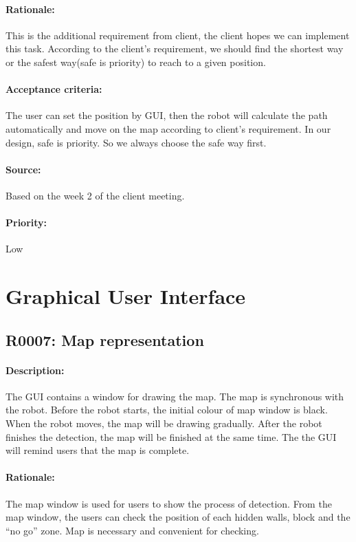 \documentclass[11pt, a4paper]{report}
\begin{document}
\paragraph{Rationale:}
This is the additional requirement from client, the client hopes we can implement this task. According to the client's requirement, we should find the shortest way or the safest way(safe is priority) to reach to a given position. 
\paragraph{Acceptance criteria:}
The user can set the position by GUI, then the robot will calculate the path automatically and move on the map according to client's requirement. In our design, safe is priority. So we always choose the safe way first.     
\paragraph{Source:}
Based on the week 2 of the client meeting.  
\paragraph{Priority:}
Low


\section{Graphical User Interface}
\subsection{R0007: Map representation}
\paragraph{Description:}
The GUI contains a window for drawing the map. The map is synchronous with the robot. Before the  robot starts, the initial colour of map window is black. When the robot moves, the map will be drawing gradually. After the robot finishes the detection, the map will be finished at the same time. The the GUI will remind users that the map is complete.
\paragraph{Rationale:}
The map window is used for users to show the process of detection. From the map window, the users can check the position of each hidden walls, block and the “no go” zone. Map is necessary and convenient for checking.
\end{document}
